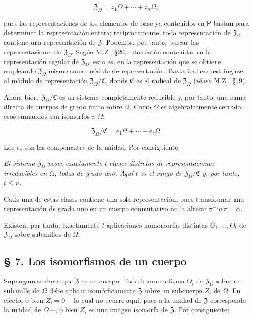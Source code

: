 \[
\mathfrak Z_\Omega=z_1\Omega+\cdots+z_n\Omega,
\]

pues las representaciones de los elementos de base ya contenidos en $\mathsf P$ bastan para determinar la representación entera; recíprocamente, toda representación de $\mathfrak Z_\Omega$ contiene una representación de $\mathfrak Z$. Podemos, por tanto, buscar las representaciones de $\mathfrak Z_\Omega$. Según M.Z., §20, estas están contenidas en la representación regular de $\mathfrak Z_\Omega$, esto es, en la representación que se obtiene empleando $\mathfrak Z_\Omega$ mismo como módulo de representación. Basta incluso restringirse al módulo de representación $\mathfrak Z_\Omega/\mathfrak C$, donde $\mathfrak C$ es el radical de $\mathfrak Z_\Omega$ (véase M.Z., §19).

Ahora bien, $\mathfrak Z_\Omega/\mathfrak C$ es un sistema completamente reducible y, por tanto, una suma directa de cuerpos de grado finito sobre $\Omega$. Como $\Omega$ es algebraicamente cerrado, esos sumandos son isomorfos a $\Omega$:

\[
\mathfrak Z_\Omega/\mathfrak C=e_1\Omega+\cdots+e_t\Omega.
\]

Los $e_\nu$ son las componentes de la unidad. Por consiguiente:

\emph{El sistema $\mathfrak Z_\Omega$ posee exactamente $t$ clases distintas de representaciones irreducibles en $\Omega$, todas de grado uno. Aquí $t$ es el rango de $\mathfrak Z_\Omega/\mathfrak C$ y, por tanto, $t\leq n$.}

Cada una de estas clases contiene una sola representación, pues transformar una representación de grado uno en un cuerpo conmutativo no la altera: $\pi^{-1}\alpha\pi=\alpha$.

Existen, por tanto, exactamente $t$ aplicaciones homomorfas distintas $\Theta_1,\ldots,\Theta_t$ de $\mathfrak Z_\Omega$ sobre subanillos de $\Omega$.

\subsection*{§ 7. Los isomorfismos de un cuerpo}

Supongamos ahora que $\mathfrak Z$ es un cuerpo. Todo homomorfismo $\Theta_i$ de $\mathfrak Z_\Omega$ sobre un subanillo de $\Omega$ debe aplicar isomórficamente $\mathfrak Z$ sobre un subcuerpo $Z_i$ de $\Omega$. En efecto, o bien $Z_i=0$ ---lo cual no ocurre aquí, pues a la unidad de $\mathfrak Z$ corresponde la unidad de $\Omega$---, o bien $Z_i$ es una imagen isomorfa de $\mathfrak Z$. Por consiguiente:

